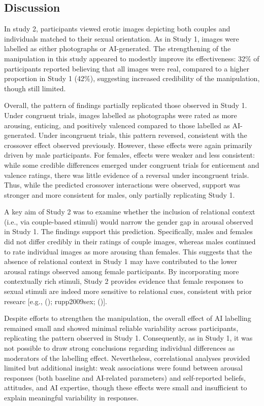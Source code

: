 \documentclass[
  jou,
  floatsintext,
  longtable,
  nolmodern,
  notxfonts,
  notimes,
  colorlinks=true,linkcolor=blue,citecolor=blue,urlcolor=blue]{apa7}
\begin{document}
\subsection{Discussion}\label{discussion-1}

In study 2, participants viewed erotic images depicting both couples and
individuals matched to their sexual orientation. As in Study 1, images
were labelled as either photographs or AI-generated. The strengthening
of the manipulation in this study appeared to modestly improve its
effectiveness: 32\% of participants reported believing that all images
were real, compared to a higher proportion in Study 1 (42\%), suggesting
increased credibility of the manipulation, though still limited.

Overall, the pattern of findings partially replicated those observed in
Study 1. Under congruent trials, images labelled as photographs were
rated as more arousing, enticing, and positively valenced compared to
those labelled as AI-generated. Under incongruent trials, this pattern
reversed, consistent with the crossover effect observed previously.
However, these effects were again primarily driven by male participants.
For females, effects were weaker and less consistent: while some
credible differences emerged under congruent trials for enticement and
valence ratings, there was little evidence of a reversal under
incongruent trials. Thus, while the predicted crossover interactions
were observed, support was stronger and more consistent for males, only
partially replicating Study 1.

A key aim of Study 2 was to examine whether the inclusion of relational
context (i.e., via couple-based stimuli) would narrow the gender gap in
arousal observed in Study 1. The findings support this prediction.
Specifically, males and females did not differ credibly in their ratings
of couple images, whereas males continued to rate individual images as
more arousing than females. This suggests that the absence of relational
context in Study 1 may have contributed to the lower arousal ratings
observed among female participants. By incorporating more contextually
rich stimuli, Study 2 provides evidence that female responses to sexual
stimuli are indeed more sensitive to relational cues, consistent with
prior researc {[}e.g.,
(); rupp2009sex;
(){]}.

Despite efforts to strengthen the manipulation, the overall effect of AI
labelling remained small and showed minimal reliable variability across
participants, replicating the pattern observed in Study 1. Consequently,
as in Study 1, it was not possible to draw strong conclusions regarding
individual differences as moderators of the labelling effect.
Nevertheless, correlational analyses provided limited but additional
insight: weak associations were found between arousal responses (both
baseline and AI-related parameters) and self-reported beliefs,
attitudes, and AI expertise, though these effects were small and
insufficient to explain meaningful variability in responses.
\end{document}
